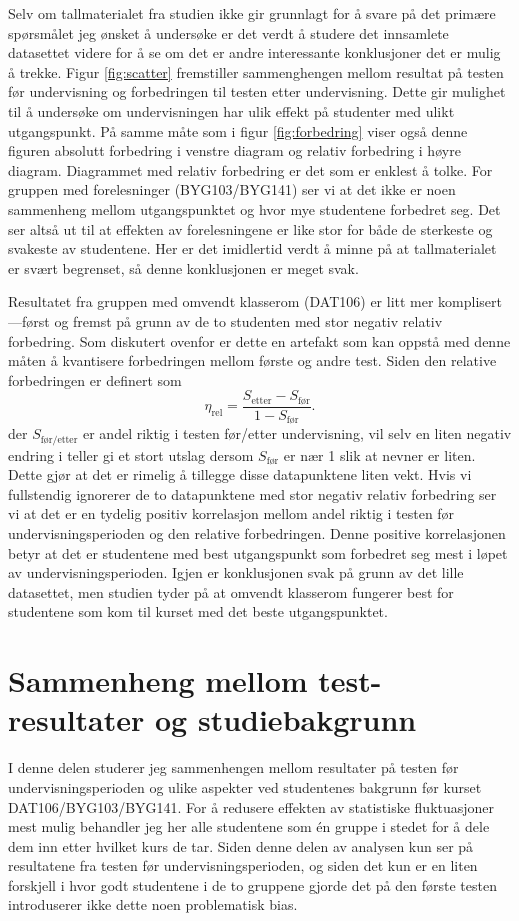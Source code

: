\documentclass[a4paper,norsk,12pt]{report}
\begin{document}
Selv om tallmaterialet fra studien ikke gir grunnlagt for å svare på det primære spørsmålet jeg ønsket å undersøke er det verdt å studere det innsamlete datasettet videre for å se om det er andre interessante konklusjoner det er mulig å trekke. Figur \ref{fig:scatter} fremstiller sammenghengen mellom resultat på testen før undervisning og forbedringen til testen etter undervisning. Dette gir mulighet til å undersøke om undervisningen har ulik effekt på studenter med ulikt utgangspunkt. På samme måte som i figur \ref{fig:forbedring} viser også denne figuren absolutt forbedring i venstre diagram og relativ forbedring i høyre diagram. Diagrammet med relativ forbedring er det som er enklest å tolke. For gruppen med forelesninger (BYG103/BYG141) ser vi at det ikke er noen sammenheng mellom utgangspunktet og hvor mye studentene forbedret seg. Det ser altså ut til at effekten av forelesningene er like stor for både de sterkeste og svakeste av studentene. Her er det imidlertid verdt å minne på at tallmaterialet er svært begrenset, så denne konklusjonen er meget svak.

Resultatet fra gruppen med omvendt klasserom (DAT106) er litt mer komplisert---først og fremst på grunn av de to studenten med stor negativ relativ forbedring. Som diskutert ovenfor er dette en artefakt som kan oppstå med denne måten å kvantisere forbedringen mellom første og andre test. Siden den relative forbedringen er definert som 
\begin{displaymath}
	\eta_\text{rel} = \frac{S_\text{etter}-S_\text{før}}{1 - S_\text{før}}.
\end{displaymath}
der $S_\text{før/etter}$ er andel riktig i testen før/etter undervisning, vil selv en liten negativ endring i teller gi et stort utslag dersom $S_\text{før}$ er nær 1 slik at nevner er liten. Dette gjør at det er rimelig å tillegge disse datapunktene liten vekt. Hvis vi fullstendig ignorerer de to datapunktene med stor negativ relativ forbedring ser vi at det er en tydelig positiv korrelasjon mellom andel riktig i testen før undervisningsperioden og den relative forbedringen. Denne positive korrelasjonen betyr at det er studentene med best utgangspunkt som forbedret seg mest i løpet av undervisningsperioden. Igjen er konklusjonen svak på grunn av det lille datasettet, men studien tyder på at omvendt klasserom fungerer best for studentene som kom til kurset med det beste utgangspunktet. 

\section{Sammenheng mellom test-resultater og studiebakgrunn}
I denne delen studerer jeg sammenhengen mellom resultater på testen før undervisningsperioden og ulike aspekter ved studentenes bakgrunn før kurset DAT106/BYG103/BYG141. For å redusere effekten av statistiske fluktuasjoner mest mulig behandler jeg her alle studentene som \'en gruppe i stedet for å dele dem inn etter hvilket kurs de tar. Siden denne delen av analysen kun ser på resultatene fra testen før undervisningsperioden, og siden det kun er en liten forskjell i hvor godt studentene i de to gruppene gjorde det på den første testen introduserer ikke dette noen problematisk bias.
\end{document}
